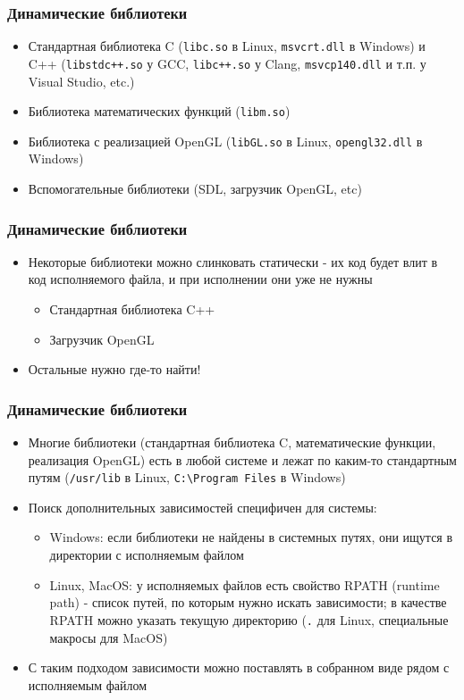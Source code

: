 \documentclass{beamer}
\begin{document}
\begin{frame}[fragile]
\frametitle{Динамические библиотеки}
\begin{itemize}
\item Стандартная библиотека C (\verb|libc.so| в Linux, \verb|msvcrt.dll| в Windows) и C++ (\verb|libstdc++.so| у GCC, \verb|libc++.so| у Clang, \verb|msvcp140.dll| и т.п. у Visual Studio, etc.)
\pause
\item Библиотека математических функций (\verb|libm.so|)
\pause
\item Библиотека с реализацией OpenGL (\verb|libGL.so| в Linux, \verb|opengl32.dll| в Windows)
\pause
\item Вспомогательные библиотеки (SDL, загрузчик OpenGL, etc)
\end{itemize}
\end{frame}

\begin{frame}[fragile]
\frametitle{Динамические библиотеки}
\begin{itemize}
\item Некоторые библиотеки можно слинковать статически - их код будет влит в код исполняемого файла, и при исполнении они уже не нужны
\pause
\begin{itemize}
\item Стандартная библиотека C++
\pause
\item Загрузчик OpenGL
\end{itemize}
\pause
\item Остальные нужно где-то найти!
\end{itemize}
\end{frame}

\begin{frame}[fragile]
\frametitle{Динамические библиотеки}
\begin{itemize}
\item Многие библиотеки (стандартная библиотека C, математические функции, реализация OpenGL) есть в любой системе и лежат по каким-то стандартным путям (\verb|/usr/lib| в Linux, \verb|C:\Program Files| в Windows)
\pause
\item Поиск дополнительных зависимостей специфичен для системы:
\pause
\begin{itemize}
\item Windows: если библиотеки не найдены в системных путях, они ищутся в директории с исполняемым файлом
\pause
\item Linux, MacOS: у исполняемых файлов есть свойство RPATH (runtime path) - список путей, по которым нужно искать зависимости; в качестве RPATH можно указать текущую директорию (\verb|.| для Linux, специальные макросы для MacOS)
\end{itemize}
\pause
\item С таким подходом зависимости можно поставлять в собранном виде рядом с исполняемым файлом
\end{itemize}
\end{frame}
\end{document}
